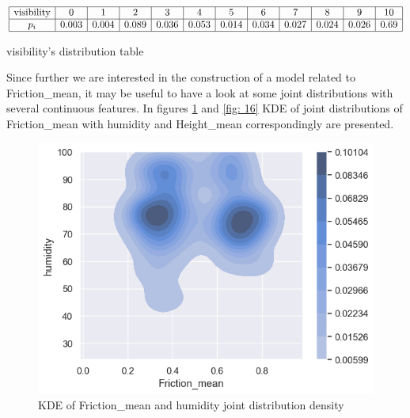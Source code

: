 \documentclass[12pt, bachelor, substylefile = algo_title.rtx]{disser}
\theoremstyle{definition}
\begin{document}
\begin{table}[!h]
$$
\begin{array}{|c|c|c|c|c|c|c|c|c|c|c|c|}
\hline
\text{visibility} & 0 & 1 & 2 & 3 & 4 & 5 & 6 & 7 & 8 & 9 & 10\\
\hline
p_i & 0.003 & 0.004 & 0.089 & 0.036 & 0.053 & 0.014 & 0.034 & 0.027 & 0.024 & 0.026 & 0.69\\
\hline
\end{array}
$$
\caption{visibility's distribution table}
\label{tab: 1}
\end{table}

Since further we are interested in the construction of a model related to Friction\_mean, it may be useful to have a look at some joint distributions with several continuous features. In figures \ref{fig: 15} and \ref{fig: 16} KDE of joint distributions of Friction\_mean with humidity and Height\_mean correspondingly are presented. 


\begin{figure}[!h]
\centering
   \begin{minipage}{0.7\textwidth}
     \includegraphics[width=\linewidth]{frihum}
   \end{minipage}
\caption{KDE of Friction\_mean and humidity joint distribution density}
\label{fig: 15}
\end{figure}
\end{document}
